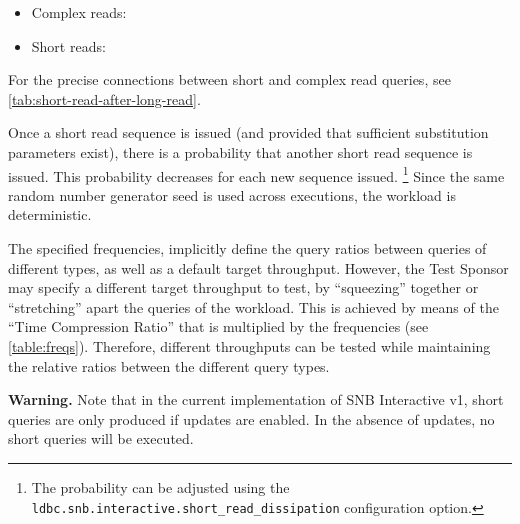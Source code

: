 \begin{itemize}
\item Complex reads:
\item Short reads:
\end{itemize}

For the precise connections between short and complex read queries, see \autoref{tab:short-read-after-long-read}.

Once a short read sequence is issued (and provided that sufficient substitution parameters 
exist), there is a probability that another short read sequence is issued. This probability decreases for each new sequence issued.%
\footnote{The probability can be adjusted using the \texttt{ldbc.snb.interactive.short\_read\_dissipation} configuration option.}
Since the same random number generator seed is used across
executions, the workload is deterministic.



The specified frequencies, implicitly define the query ratios between queries
of different types, as well as a default target throughput. However, the Test
Sponsor may specify a different target throughput to test,  by ``squeezing''
together or ``stretching'' apart the queries of the workload. This is
achieved by means of the ``Time Compression Ratio'' that is multiplied by the
frequencies (see \autoref{table:freqs}).  Therefore, different
throughputs can be tested while maintaining the relative ratios between the
different query types.

\textbf{Warning.} Note that in the current implementation of SNB Interactive v1, short queries are only produced if updates are enabled. In the absence of updates, no short queries will be executed.
